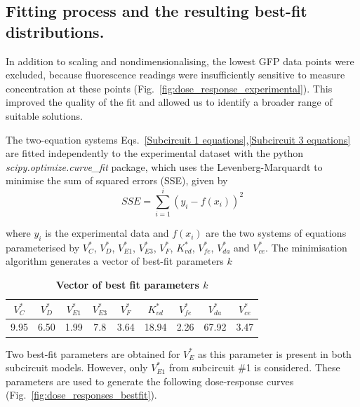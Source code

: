 \subsection{Fitting process and the resulting best-fit distributions.} \label{Fitting process and the resulting best fit distributions.}
In addition to scaling and nondimensionalising, the lowest GFP data points were excluded,
because fluorescence readings were insufficiently sensitive
to measure concentration at these points (Fig.~\ref{fig:dose_response_experimental}).
This improved the quality of the fit and allowed us to identify a broader range of suitable solutions.

The two-equation systems Eqs.~\ref{Subcircuit 1 equations},\ref{Subcircuit 3 equations}
are fitted independently to the experimental dataset with the python \textit{scipy.optimize.curve\_fit} package,
which uses the Levenberg-Marquardt to minimise the sum of squared errors (SSE), given by
\begin{equation}
    SSE = \sum_{i=1}^{i} (y_{i}-f(x_{i}))^2
\end{equation}

where $y_i$ is the experimental data
and $f(x_i)$ are the two systems of equations
parameterised by $V^*_{C}$, $V^*_{D}$, $V^*_{E1}$, $V^*_{E3}$, $V^*_{F}$, $K^*_{vd}$, $V^*_{fe}$, $V^*_{da}$
and $V^*_{ce}$.
The minimisation algorithm generates a vector of best-fit parameters $k$

\begin{table}[H]
    \centering
    \begin{tabular}{|c|c|c|c|c|c|c|c|c|}
        \hline
        \textbf{$V^*_{C}$} & \textbf{$V^*_{D}$} & \textbf{$V^*_{E1}$} & \textbf{$V^*_{E3}$} & \textbf{$V^*_{F}$} & \textbf{$K^*_{vd}$} & \textbf{$V^*_{fe}$} & \textbf{$V^*_{da}$} & \textbf{$V^*_{ce}$} \\
        \hline
        9.95 & 6.50 & 1.99 & 7.8 & 3.64 & 18.94 & 2.26 & 67.92 & 3.47 \\
        \hline
    \end{tabular}
    \caption{\textbf{Vector of best fit parameters $k$}}
    \label{table:bestfit table}
\end{table}


Two best-fit parameters are obtained for $V^*_{E}$ as this parameter is present in both subcircuit models.
However, only $V^*_{E1}$ from subcircuit \#1 is considered.
These parameters are used to generate the following dose-response curves (Fig.~\ref{fig:dose_responses_bestfit}).


